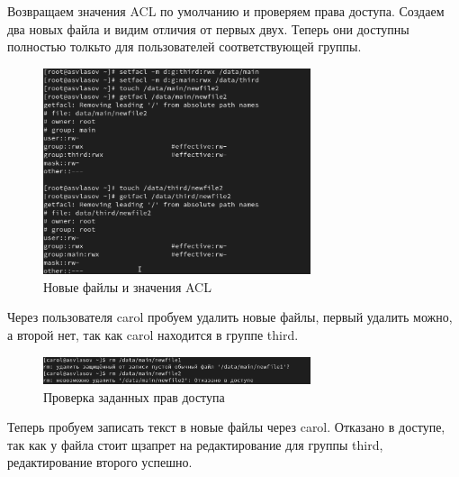 \documentclass[
  12pt,
  a4paper,
  DIV=11,
  numbers=noendperiod]{scrreprt}
\begin{document}
Возвращаем значения ACL по умолчанию и проверяем права доступа. Создаем
два новых файла и видим отличия от первых двух. Теперь они доступны
полностью толкьто для пользователей соответствующей группы.

\begin{figure}

{\centering \includegraphics[width=0.7\textwidth,height=\textheight]{image/10.png}

}

\caption{Новые файлы и значения ACL}

\end{figure}%

Через пользователя carol пробуем удалить новые файлы, первый удалить
можно, а второй нет, так как carol находится в группе third.

\begin{figure}

{\centering \includegraphics[width=0.7\textwidth,height=\textheight]{image/11.png}

}

\caption{Проверка заданных прав доступа}

\end{figure}%

Теперь пробуем записать текст в новые файлы через carol. Отказано в
доступе, так как у файла стоит щзапрет на редактирование для группы
third, редактирование второго успешно.
\end{document}
